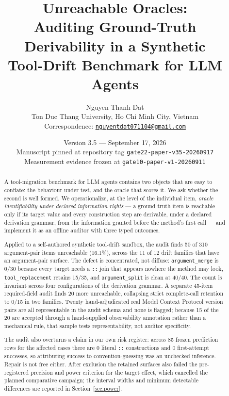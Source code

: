 \documentclass[11pt]{article}
\title{\textbf{Unreachable Oracles:}\\[2pt]
Auditing Ground-Truth Derivability in a Synthetic\\ Tool-Drift Benchmark for LLM Agents}
\author{%
  Nguyen Thanh Dat\\[2pt]
  \normalsize Ton Duc Thang University, Ho Chi Minh City, Vietnam\\[2pt]
  \normalsize Correspondence: \href{mailto:nguyentdat071104@gmail.com}{\texttt{nguyentdat071104@gmail.com}}%
}
\date{Version 3.5 --- September 17, 2026\\[2pt]
\normalsize Manuscript pinned at repository tag \texttt{gate22-paper-v35-20260917}\\[1pt]
\normalsize Measurement evidence frozen at \texttt{gate10-paper-v1-20260911}}
\newcommand{\dfam}[1]{\texttt{#1}}
\begin{document}
\maketitle

\begin{abstract}
\noindent
A tool-migration benchmark for LLM agents contains two objects that are easy
to conflate: the behaviour under test, and the oracle that scores it. We ask
whether the second is well formed. We operationalize, at the level of the
individual item, \emph{oracle identifiability under declared information
rights} --- a ground-truth item is reachable only if its target value and every
construction step are derivable, under a declared derivation grammar, from the
information granted before the method's first call --- and implement it as an
offline auditor with three typed outcomes.

Applied to a self-authored synthetic tool-drift sandbox, the audit finds 50 of
310 argument-pair items unreachable (16.1\%), across the 11 of 12 drift
families that have an argument-pair surface. The
defect is concentrated, not diffuse: \dfam{argument\_merge} is 0/30 because
every target needs a \texttt{::} join that appears nowhere the method may look,
\dfam{tool\_replacement} retains 15/35, and \dfam{argument\_split} is clean at
40/40. The count is invariant across four configurations of the derivation
grammar. A separate 45-item required-field audit finds 20 more unreachable,
collapsing strict complete-call retention to 0/15 in two families. Twenty
hand-adjudicated real Model Context Protocol version pairs are all
representable in the audit schema and none is flagged; because 15 of the 20
are accepted through a hand-supplied observability annotation rather than a
mechanical rule, that sample tests representability, not auditor specificity.

The audit also overturns a claim in our own risk register: across 85 frozen
prediction rows for the affected cases there are 0 literal \texttt{::}
constructions and 0 first-attempt successes, so attributing success to
convention-guessing was an unchecked inference. Repair is not free either.
After exclusion the retained surfaces also failed the pre-registered precision
and power criterion for the target effect, which cancelled the planned
comparative campaign; the interval widths and minimum detectable differences
are reported in Section~\ref{sec:power}.
\end{abstract}
\end{document}
